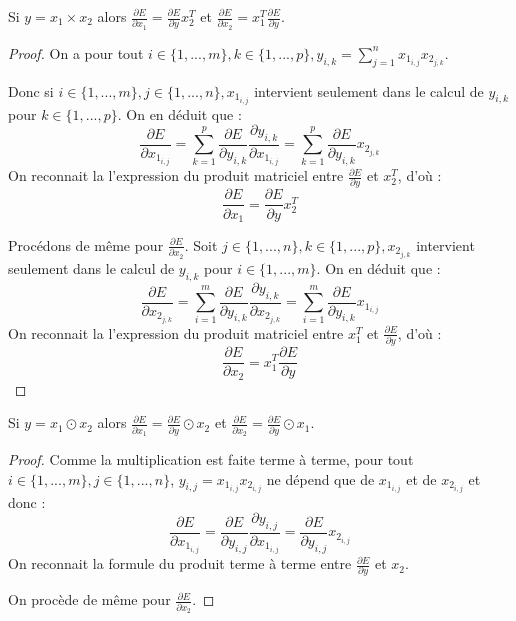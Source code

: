 \begin{proposition}
Si $y = x_1 \times x_2$ alors $\frac{\partial E}{\partial x_1} = \frac{\partial E}{\partial y} x_2^T$ et $\frac{\partial E}{\partial x_2} = x_1^T \frac{\partial E}{\partial y}$.
\end{proposition}

\begin{proof}
On a pour tout $i \in \{1, ..., m\}, k \in \{1, ..., p\}, y_{i, k} = \sum_{j = 1}^{n}{x_{1_{i, j}}x_{2_{j, k}}}$.

Donc si $i \in \{1, ..., m\}, j \in \{1, ..., n\}, x_{1_{i, j}}$ intervient seulement dans le calcul de $y_{i, k}$ pour $k \in \{1, ..., p\}$. On en déduit que :
$$
\frac{\partial E}{\partial x_{1_{i, j}}} = \sum_{k = 1}^{p}{\frac{\partial E}{\partial y_{i, k}}\frac{\partial y_{i, k}}{\partial x_{1_{i, j}}}} = \sum_{k = 1}^{p}{\frac{\partial E}{\partial y_{i, k}}x_{2_{j, k}}} 
$$ 
On reconnait la l'expression du produit matriciel entre $\frac{\partial E}{\partial y}$ et $x_2^T$, d'où :
$$
\frac{\partial E}{\partial x_1} = \frac{\partial E}{\partial y} x_2^T
$$

Procédons de même pour $\frac{\partial E}{\partial x_2}$. Soit $j \in \{1, ..., n\}, k \in \{1, ..., p\}, x_{2_{j, k}}$ intervient seulement dans le calcul de $y_{i, k}$ pour $i \in \{1, ..., m\}$. On en déduit que :
$$
\frac{\partial E}{\partial x_{2_{j, k}}} = \sum_{i = 1}^{m}{\frac{\partial E}{\partial y_{i, k}}\frac{\partial y_{i, k}}{\partial x_{2_{j, k}}}} = \sum_{i = 1}^{m}{\frac{\partial E}{\partial y_{i, k}}x_{1_{i, j}}} 
$$ 
On reconnait la l'expression du produit matriciel entre $x_1^T$ et $\frac{\partial E}{\partial y}$, d'où :
$$
\frac{\partial E}{\partial x_2} = x_1^T \frac{\partial E}{\partial y}
$$
\end{proof}

\begin{proposition}
Si $y = x_1 \odot x_2$ alors $\frac{\partial E}{\partial x_1} = \frac{\partial E}{\partial y} \odot x_2$ et $\frac{\partial E}{\partial x_2} = \frac{\partial E}{\partial y} \odot x_1$.
\end{proposition}

\begin{proof}
Comme la multiplication est faite terme à terme, pour tout $i \in \{1, ..., m\}, j \in \{1, ..., n\}$, $y_{i, j} = x_{1_{i, j}}x_{2_{i, j}}$ ne dépend que de $x_{1_{i, j}}$ et de $x_{2_{i, j}}$ et donc :
$$
\frac{\partial E}{\partial x_{1_{i, j}}} = \frac{\partial E}{\partial y_{i, j}}\frac{\partial y_{i, j}}{\partial x_{1_{i, j}}} = \frac{\partial E}{\partial y_{i, j}}x_{2_{i, j}}
$$
On reconnait la formule du produit terme à terme entre $\frac{\partial E}{\partial y}$ et $x_2$.

On procède de même pour $\frac{\partial E}{\partial x_2}$.
\end{proof}

